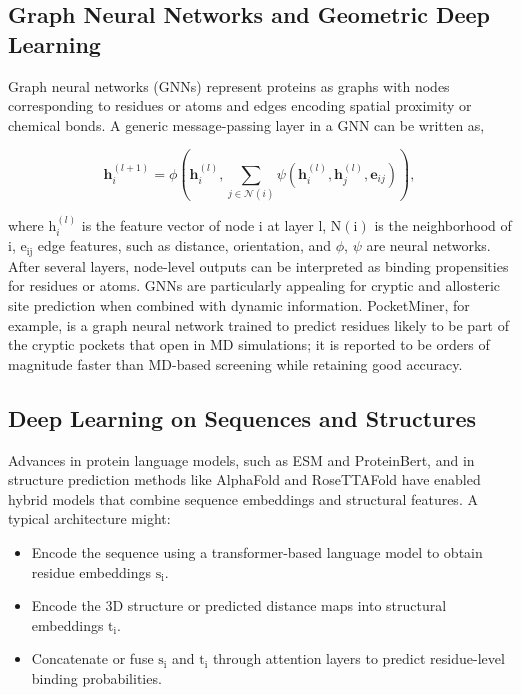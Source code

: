 \documentclass[12pt]{article}
\begin{document}
\subsection{Graph Neural Networks and Geometric Deep Learning}

Graph neural networks (GNNs) represent proteins as graphs with nodes corresponding to residues or atoms and edges encoding spatial proximity or chemical bonds\cite{CH5_mou2025deep,CH5_meller2023predicting}. A generic message-passing layer in a GNN can be written as,

\begin{equation}
\mathbf{h}_i^{(l+1)} = \phi \left( \mathbf{h}_i^{(l)}, \sum_{j \in \mathcal{N}(i)} \psi \left( \mathbf{h}_i^{(l)}, \mathbf{h}_j^{(l)}, \mathbf{e}_{ij} \right) \right),
\label{eq:gnn}
\end{equation}

where $\textrm{h}_i^{(l)}$ is the feature vector of node i at layer l, $\textrm{N}(\textrm{i})$ is the neighborhood of i, $\textrm{e}_{\textrm{ij}}$ edge features, such as distance, orientation, and $\phi$, $\psi$ are neural networks. After several layers, node-level outputs can be interpreted as binding propensities for residues or atoms. GNNs are particularly appealing for cryptic and allosteric site prediction when combined with dynamic information. PocketMiner\cite{CH5_meller2023predicting}, for example, is a graph neural network trained to predict residues likely to be part of the cryptic pockets that open in MD simulations; it is reported to be orders of magnitude faster than MD-based screening while retaining good accuracy.

\subsection{Deep Learning on Sequences and Structures}

Advances in protein language models, such as ESM\cite{CH5_lin2023evolutionary} and ProteinBert\cite{CH5_brandes2022proteinbert}, and in structure prediction methods like AlphaFold and RoseTTAFold have enabled hybrid models that combine sequence embeddings and structural features. 
A typical architecture might:
\begin{itemize}
    \item Encode the sequence using a transformer-based language model to obtain residue embeddings $\textrm{s}_\textrm{i}$.
    \item Encode the 3D structure or predicted distance maps into structural embeddings $\textrm{t}_\textrm{i}$.
    \item Concatenate or fuse $\textrm{s}_\textrm{i}$ and $\textrm{t}_\textrm{i}$ through attention layers to predict residue-level binding probabilities.
\end{itemize}
\end{document}
